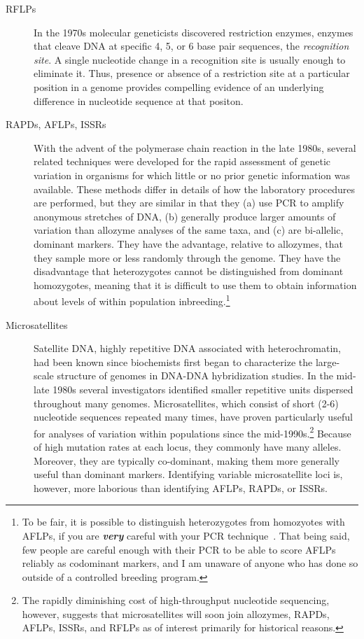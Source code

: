 \begin{description}
\item[RFLPs] In the 1970s molecular geneticists discovered restriction
  enzymes, enzymes that cleave DNA at specific 4, 5, or 6 base pair
  sequences, the {\it recognition site}. A single nucleotide change in
  a recognition site is usually enough to eliminate it. Thus, presence
  or absence of a restriction site at a particular position in a
  genome provides compelling evidence of an underlying difference in
  nucleotide sequence at that positon.

\item[RAPDs, AFLPs, ISSRs] With the advent of the polymerase chain
  reaction in the late 1980s, several related techniques were
  developed for the rapid assessment of genetic variation in organisms
  for which little or no prior genetic information was
  available. These methods differ in details of how the laboratory
  procedures are performed, but they are similar in that they (a) use
  PCR to amplify anonymous stretches of DNA, (b) generally produce
  larger amounts of variation than allozyme analyses of the same taxa,
  and (c) are bi-allelic, dominant markers. They have the advantage,
  relative to allozymes, that they sample more or less randomly
  through the genome. They have the disadvantage that heterozygotes
  cannot be distinguished from dominant homozygotes, meaning that it
  is difficult to use them to obtain information about levels of
  within population inbreeding.\footnote{To be fair,
    it is possible to distinguish heterozygotes from homozyotes with
    AFLPs, if you are {\it\bf very\/} careful with your PCR
    technique~\cite{Jansen-etal-2001}. That being said, few people are
    careful enough with their PCR to be able to score AFLPs reliably
    as codominant markers, and I am unaware of anyone who has done so
    outside of a controlled breeding program.}

\item[Microsatellites] Satellite DNA, highly repetitive DNA associated
  with heterochromatin, had been known since biochemists first began
  to characterize the large-scale structure of genomes in DNA-DNA
  hybridization studies. In the mid-late 1980s several investigators
  identified smaller repetitive units dispersed throughout many
  genomes. Microsatellites, which consist of short (2-6) nucleotide
  sequences repeated many times, have proven particularly useful for
  analyses of variation within populations since the
  mid-1990s.\footnote{The rapidly diminishing cost of high-throughput
    nucleotide sequencing, however, suggests that microsatellites will
    soon join allozymes, RAPDs, AFLPs, ISSRs, and RFLPs as of interest
    primarily for historical reasons.} Because of high mutation rates
  at each locus, they commonly have many alleles. Moreover, they are
  typically co-dominant, making them more generally useful than
  dominant markers. Identifying variable microsatellite loci is,
  however, more laborious than identifying AFLPs, RAPDs, or ISSRs.


\end{description}
